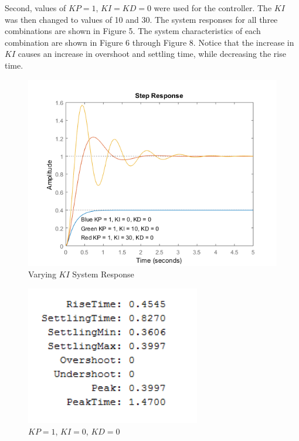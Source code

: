 \documentclass[12pt]{article}
\begin{document}
\bigskip
\bigskip

Second, values of $KP=1$, $KI=KD=0$ were used for the controller. The $KI$ was then changed to values of 10 and 30. The system responses for all three combinations are shown in Figure 5. The system characteristics of each combination are shown in Figure 6 through Figure 8. Notice that the increase in $KI$ causes an increase in overshoot and settling time, while decreasing the rise time.

\newpage

\begin{figure}[h!] %
   \centering
   \includegraphics[width=\linewidth]{part_2_response.png} 
   \caption{Varying $KI$ System Response}
   \label{fig:example}
\end{figure}

\bigskip

\begin{figure}[h!] %
   \centering
   \includegraphics[width=3in]{2_100.png} 
   \caption{$KP = 1$, $KI = 0$, $KD = 0$}
   \label{fig:example}
\end{figure}
\end{document}
